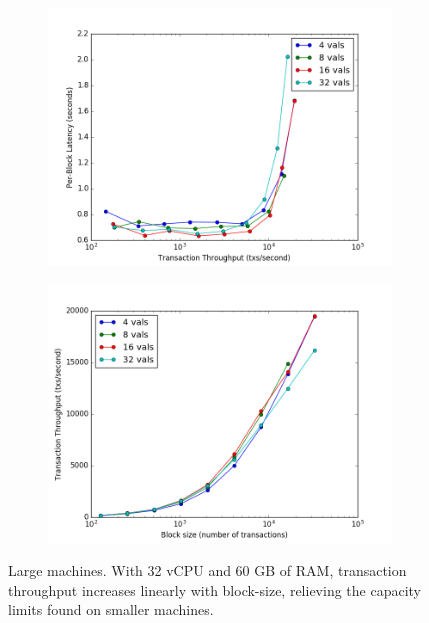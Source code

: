 \begin{figure}[]
	\centering
	\begin{subfigure}{0.8 \textwidth}
		\includegraphics[width=\linewidth,height=\textheight,keepaspectratio]{figures/throughput/large_instances/latency-throughput.png}
		\centering
	\end{subfigure}

	\begin{subfigure}{0.8 \textwidth}
		\includegraphics[width=\linewidth,height=\textheight,keepaspectratio]{figures/throughput/large_instances/throughput-blocksize.png}
	\end{subfigure}
	\centering
	\caption[Throughput-blocksize in non-faulty global network on large machines]{Large machines.
With 32 vCPU and 60 GB of RAM, transaction throughput increases linearly with block-size, 
relieving the capacity limits found on smaller machines.}
	\label{fig:exp:throughput:large}
\end{figure}

